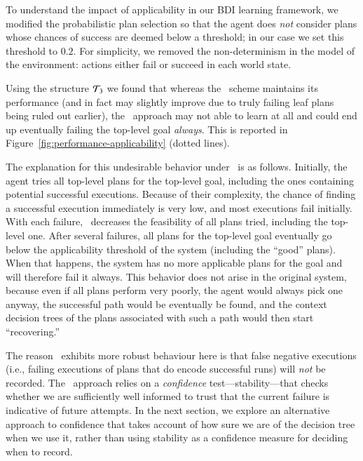 To understand the impact of applicability in our BDI learning framework, we
modified the probabilistic plan selection so that the agent does \emph{not} consider
plans whose chances of success are deemed below a threshold; in our case we set
this threshold to $0.2$.
For simplicity, we  removed the non-determinism in the model of the
environment: actions either fail or succeed in each world state.

Using the structure ${\mathcal{T}}_3$ we found that whereas the \BUL\ scheme maintains its
performance (and in fact may slightly improve due to truly failing leaf plans
being ruled out earlier), the \CL\ approach may not able to learn at all and
could end up eventually failing the top-level goal \emph{always}. This is
reported in Figure~\ref{fig:performance-applicability} (dotted lines).

The explanation for this undesirable behavior under \CL\ is as follows.
Initially, the agent tries all top-level plans for the top-level goal, including
the ones containing potential successful executions. Because of their complexity,
the chance of finding a successful execution immediately is very low, and most
executions fail initially. With each failure, \CL\ decreases the feasibility of
all plans tried, including the top-level one.  After several failures, all plans
for the top-level goal eventually go below the applicability threshold of the
system (including the ``good'' plans). When that happens, the system has no more
applicable plans for the goal and will therefore fail it always.
This behavior does not arise in the original system, because even if all plans
perform very poorly, the agent would always pick one anyway, the successful path
would be eventually be found, and the context decision trees of the plans
associated with such a path would then start ``recovering.''


The reason \BUL\ exhibits more robust behaviour here is that false negative
executions (i.e., failing executions of plans that do encode successful
runs) will \emph{not} be recorded.
The \BUL\ approach relies on a \emph{confidence} test---stability---that checks
whether we are sufficiently well informed to trust that the current failure is
indicative of future attempts.
In the next section, we explore an alternative approach to confidence 
that takes account of how sure we are of the decision tree when we use
it, rather than using stability as a confidence measure for deciding when to record.
